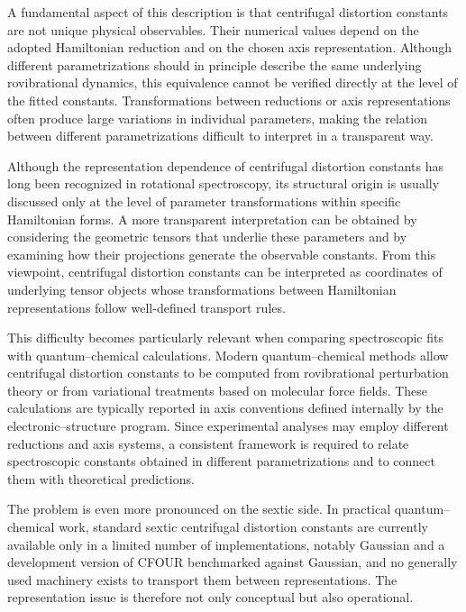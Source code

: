 \documentclass[journal=jacsat,manuscript=article]{achemso}
\begin{document}
A fundamental aspect of this description is that centrifugal distortion
constants are not unique physical observables. Their numerical values
depend on the adopted Hamiltonian reduction and on the chosen axis
representation. Although different parametrizations should in principle
describe the same underlying rovibrational dynamics, this equivalence
cannot be verified directly at the level of the fitted constants.
Transformations between reductions or axis representations often produce
large variations in individual parameters, making the relation between
different parametrizations difficult to interpret in a transparent way.

Although the representation dependence of centrifugal distortion
constants has long been recognized in rotational spectroscopy, its
structural origin is usually discussed only at the level of parameter
transformations within specific Hamiltonian forms. A more transparent
interpretation can be obtained by considering the geometric tensors
that underlie these parameters and by examining how their projections
generate the observable constants. From this viewpoint, centrifugal
distortion constants can be interpreted as coordinates of underlying
tensor objects whose transformations between Hamiltonian
representations follow well-defined transport rules.

This difficulty becomes particularly relevant when comparing spectroscopic
fits with quantum--chemical calculations.
Modern quantum--chemical methods allow centrifugal distortion constants
to be computed from rovibrational perturbation theory or from variational
treatments based on molecular force fields.
\cite{Nielsen1951,Mills1972,Clabo1988,Barone2005,Puzzarini2010,Franke2021}
These calculations are typically reported in axis conventions defined
internally by the electronic--structure program. Since experimental
analyses may employ different reductions and axis systems, a consistent
framework is required to relate spectroscopic constants obtained in
different parametrizations and to connect them with theoretical
predictions.

The problem is even more pronounced on the sextic side.
In practical quantum--chemical work, standard sextic centrifugal
distortion constants are currently available only in a limited number of
implementations, notably Gaussian and a development version of CFOUR
benchmarked against Gaussian, and no generally used machinery exists to
transport them between representations.
The representation issue is therefore not only conceptual but also
operational.
\end{document}

